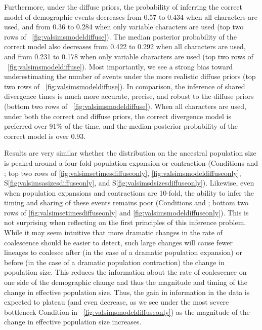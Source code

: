 \ifembed{

}{}

Furthermore, under the diffuse priors, the probability of inferring the correct
model of demographic events decreases from 0.57 to 0.434 when all characters
are used, and from 0.36 to 0.284 when only variable characters are used
(top two rows of \fig{}~\ref{fig:valsimsmodeldiffuse}).
The median posterior probability of the correct model also decreases from
0.422 to 0.292 when all characters are used,
and from 0.231 to 0.178 when only variable characters are used
(top two rows of \fig{}~\ref{fig:valsimsmodeldiffuse}).
Most importantly, we see a strong bias toward underestimating the number of
events under the more realistic diffuse priors
(top two rows of \fig{}~\ref{fig:valsimsmodeldiffuse}).
In comparison, the inference of shared divergence times is much more accurate,
precise, and robust to the diffuse priors
(bottom two rows of \fig{}~\ref{fig:valsimsmodeldiffuse}).
When all characters are used, under both the correct and diffuse
priors, the correct divergence model is preferred over 91\% of the time,
and the median posterior probability of the correct model is over
0.93.

\ifembed{

}{}

Results are very similar whether the distribution on the
ancestral population size is peaked around a four-fold population
expansion or contraction
(Conditions \msimfourinc and \msimfourdec;
top two rows of \figs
\ref{fig:valsimsetimesdiffuseonly},
\ref{fig:valsimsmodeldiffuseonly},
S\ref{fig:valsimsasizesdiffuseonly},
and
S\ref{fig:valsimsdsizesdiffuseonly}).
Likewise, even when population expansions
and contractions are 10-fold, the ability to infer
the timing and sharing of these events remains
poor
(Conditions \msimteninc and \msimtendec;
bottom two rows of \figs
\ref{fig:valsimsetimesdiffuseonly} and 
\ref{fig:valsimsmodeldiffuseonly}).
This is not surprising when reflecting on the first principles of this
inference problem.
While it may seem intuitive that more dramatic changes in the rate
of coalescence should be easier to detect, such large changes
will cause fewer lineages to coalesce
after (in the case of a dramatic population expansion)
or
before (in the case of a dramatic population contraction)
the change in population size.
This reduces the information about the rate of coalescence on one side of the
demographic change and thus the magnitude and timing of the change in effective
population size.
Thus, the gain in information in the data is expected to plateau
(and even decrease, as we see under the most severe bottleneck Condition
\msimtendec in \fig{}~\ref{fig:valsimsmodeldiffuseonly})
as the magnitude of the change in effective population size increases.

